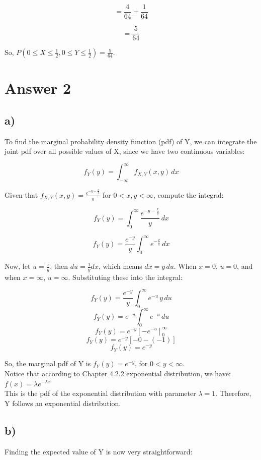 \documentclass[12pt]{article}
\begin{document}
\[
= \frac{4}{64} + \frac{1}{64}
\]

\[
= \frac{5}{64}
\]

So, \( P(0 \leq X \leq \frac{1}{2}, 0 \leq Y \leq \frac{1}{2}) = \frac{5}{64} \).

\section*{Answer 2}
\subsection*{a)} 

To find the marginal probability density function (pdf) of Y, we can integrate the joint pdf over all possible values of X, since we have two continuous variables:

\[ f_Y(y) = \int_{-\infty}^{\infty} f_{X,Y}(x, y) \, dx \]

Given that \( f_{X,Y}(x, y) = \frac{e^{-y - \frac{x}{y}}}{y} \) for \( 0 < x, y < \infty \), compute the integral:

\[ f_Y(y) = \int_{0}^{\infty} \frac{e^{-y - \frac{x}{y}}}{y} \, dx \]

\[ f_Y(y) = \frac{e^{-y}}{y} \int_{0}^{\infty} e^{-\frac{x}{y}} \, dx \]

Now, let \( u = \frac{x}{y} \), then \( du = \frac{1}{y} dx \), which means \( dx = y \, du \). When \( x = 0 \), \( u = 0 \), and when \( x = \infty \), \( u = \infty \). Substituting these into the integral:

\[ f_Y(y) = \frac{e^{-y}}{y} \int_{0}^{\infty} e^{-u} \, y \, du \]
\[ f_Y(y) = e^{-y} \int_{0}^{\infty} e^{-u} \, du \]
\[ f_Y(y) = e^{-y} [-e^{-u}]_{0}^{\infty} \]
\[ f_Y(y) = e^{-y} [-0 - (-1)] \]
\[ f_Y(y) = e^{-y} \]

So, the marginal pdf of Y is \( f_Y(y) = e^{-y} \), for \( 0 < y < \infty \). \\
Notice that according to Chapter 4.2.2 exponential distribution, we have:
\( f(x) = \lambda e^{-\lambda x } \) \\

This is the pdf of the exponential distribution with parameter \( \lambda = 1 \). Therefore, Y follows an exponential distribution.

\subsection*{b)} 

Finding the expected value of Y is now very straightforward:
\end{document}
